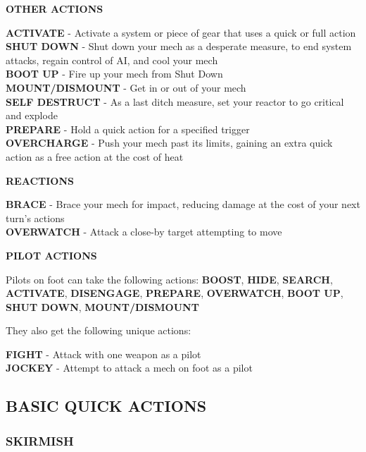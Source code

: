 \begin{center}
    \textbf{OTHER ACTIONS}
\end{center}
\textbf{ACTIVATE} - Activate a system or piece of gear that uses a quick or full action\\
\textbf{SHUT DOWN} - Shut down your mech as a desperate measure, to end system attacks, regain control of AI, and cool your mech\\
\textbf{BOOT UP} - Fire up your mech from Shut Down\\
\textbf{MOUNT/DISMOUNT} - Get in or out of your mech\\
\textbf{SELF DESTRUCT} - As a last ditch measure, set your reactor to go critical and explode\\
\textbf{PREPARE} - Hold a quick action for a specified trigger\\
\textbf{OVERCHARGE} - Push your mech past its limits, gaining an extra quick action as a free action at the cost of heat

\begin{center}
    \textbf{REACTIONS}
\end{center}
\textbf{BRACE} - Brace your mech for impact, reducing damage at the cost of your next turn’s actions\\
\textbf{OVERWATCH} - Attack a close-by target attempting to move

\begin{center}
    \textbf{PILOT ACTIONS}
\end{center}
Pilots on foot can take the following actions: \textbf{BOOST}, \textbf{HIDE}, \textbf{SEARCH}, \textbf{ACTIVATE}, \textbf{DISENGAGE}, \textbf{PREPARE}, \textbf{OVERWATCH}, \textbf{BOOT UP}, \textbf{SHUT DOWN}, \textbf{MOUNT/DISMOUNT}

They also get the following unique actions:

\textbf{FIGHT} - Attack with one weapon as a pilot \\
\textbf{JOCKEY} - Attempt to attack a mech on foot as a pilot



\subsection{BASIC QUICK ACTIONS}
                       
\subsubsection{SKIRMISH}

